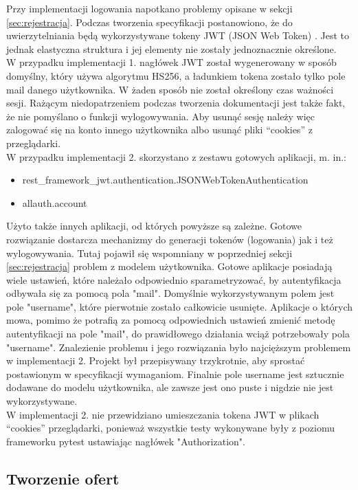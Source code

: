 \documentclass[12pt, notitlepage]{article}
\begin{document}
Przy implementacji logowania napotkano problemy opisane w sekcji \ref{sec:rejestracja}. Podczas tworzenia specyfikacji postanowiono, że do uwierzytelniania będą wykorzystywane tokeny JWT (JSON Web Token) \cite{jwt}. Jest to jednak elastyczna struktura i jej elementy nie zostały jednoznacznie określone. \\
W przypadku implementacji 1. nagłówek JWT został wygenerowany w sposób domyślny, który używa algorytmu HS256, a ładunkiem tokena zostało tylko pole mail danego użytkownika. W żaden sposób nie został określony czas ważności sesji. Rażącym niedopatrzeniem podczas tworzenia dokumentacji jest także fakt, że nie pomyślano o funkcji wylogowywania. Aby usunąć sesję należy więc zalogować się na konto innego użytkownika albo usunąć pliki ``cookies'' z przeglądarki.  \\
W przypadku implementacji 2. skorzystano z zestawu gotowych aplikacji, m. in.:
\begin{itemize}
    \item rest\_framework\_jwt.authentication.JSONWebTokenAuthentication
    \item allauth.account
\end{itemize}
Użyto także innych aplikacji, od których powyższe są zależne. Gotowe rozwiązanie dostarcza mechanizmy do generacji tokenów (logowania) jak i też wylogowywania. Tutaj pojawił się wspomniany w poprzedniej sekcji \ref{sec:rejestracja} problem z modelem użytkownika. Gotowe aplikacje posiadają wiele ustawień, które należało odpowiednio sparametryzować, by autentyfikacja odbywała się za pomocą pola "mail". Domyślnie wykorzystywanym polem jest pole "username", które pierwotnie zostało całkowicie usunięte. Aplikacje o których mowa, pomimo że potrafią za pomocą odpowiednich ustawień zmienić metodę autentyfikacji na pole "mail", do prawidłowego działania wciąż potrzebowały pola "username". Znalezienie problemu i jego rozwiązania było najcięższym problemem w implementacji 2. Projekt był przepisywany trzykrotnie, aby sprostać postawionym w specyfikacji wymaganiom. Finalnie pole username jest sztucznie dodawane do modelu użytkownika, ale zawsze jest ono puste i nigdzie nie jest wykorzystywane.  \\
W implementacji 2. nie przewidziano umieszczania tokena JWT w plikach ``cookies'' przeglądarki, ponieważ wszystkie testy wykonywane były z poziomu frameworku pytest ustawiając nagłówek "Authorization".

\subsection{Tworzenie ofert}
\end{document}

